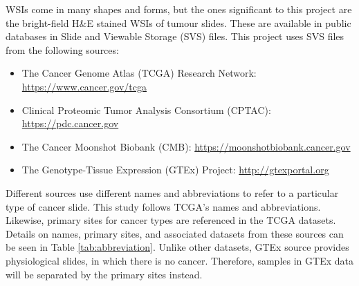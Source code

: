 \documentclass{l4proj}
\begin{document}
WSIs come in many shapes and forms, but the ones significant to this project are the bright-field H\&E stained WSIs of tumour slides. These are available in public databases in Slide and Viewable Storage (SVS) files. This project uses SVS files from the following sources:
\begin{itemize}
    \item The Cancer Genome Atlas (TCGA) Research Network: \url{https://www.cancer.gov/tcga}
    \item Clinical Proteomic Tumor Analysis Consortium (CPTAC): \url{https://pdc.cancer.gov}
    \item The Cancer Moonshot Biobank (CMB): \url{https://moonshotbiobank.cancer.gov}
    \item The Genotype-Tissue Expression (GTEx) Project: \url{http://gtexportal.org}
\end{itemize}

Different sources use different names and abbreviations to refer to a particular type of cancer slide. This study follows TCGA's names and abbreviations. Likewise, primary sites for cancer types are referenced in the TCGA datasets. Details on names, primary sites, and associated datasets from these sources can be seen in Table \ref{tab:abbreviation}. Unlike other datasets, GTEx source provides physiological slides, in which there is no cancer. Therefore, samples in GTEx data will be separated by the primary sites instead. 
\end{document}

